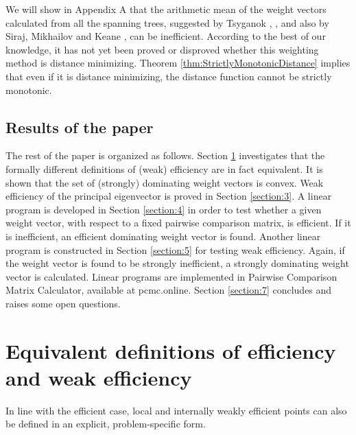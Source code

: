 \documentclass{article}
\theoremstyle{plain}
\begin{document}
We will show in Appendix A that the arithmetic mean of the weight vectors calculated from all the spanning trees,
suggested by Tsyganok \cite{Tsyganok2000}, \cite[Section 3.5 Combinatorial method]{Tsyganok2010},
and also by Siraj, Mikhailov and Keane \cite{SirajMikhailovKeane2012a,SirajMikhailovKeane2012b},
can be inef{\kern0pt}f{\kern0pt}icient. According to the best of our knowledge,
it has not yet been proved or disproved whether this weighting method is distance minimizing.
Theorem \ref{thm:StrictlyMonotonicDistance} implies that even if it is distance minimizing, the distance function
cannot be strictly monotonic. \\


\subsection{Results of the paper}
The rest of the paper is organized as follows.
Section \ref{section:2} investigates that the formally dif{\kern0pt}ferent
def{\kern0pt}initions of (weak) ef{\kern0pt}f{\kern0pt}iciency are in fact
equivalent. It is shown that the set of (strongly) dominating weight vectors is convex.
Weak ef{\kern0pt}f{\kern0pt}iciency of the principal eigenvector is proved in Section \ref{section:3}.
A linear program is developed in Section \ref{section:4} in order to test whether a given weight
vector, with respect to a f{\kern0pt}ixed pairwise comparison matrix, is ef{\kern0pt}f{\kern0pt}icient.
If it is inef{\kern0pt}f{\kern0pt}icient, an ef{\kern0pt}f{\kern0pt}icient dominating weight vector is found.
Another linear program is constructed in Section \ref{section:5} for testing weak ef{\kern0pt}f{\kern0pt}iciency.
Again, if the weight vector is found to be strongly inef{\kern0pt}f{\kern0pt}icient, a strongly dominating weight vector is
calculated.
Linear programs are implemented in Pairwise Comparison Matrix Calculator,  available at pcmc.online.
Section \ref{section:7} concludes and raises some open questions.

\section{Equivalent def{\kern0pt}initions of ef{\kern0pt}f{\kern0pt}iciency and weak ef{\kern0pt}f{\kern0pt}iciency}
\label{section:2} %

In line with the ef{\kern0pt}f{\kern0pt}icient case,
local and internally weakly ef{\kern0pt}f{\kern0pt}icient points can also be def{\kern0pt}ined in an explicit, problem-specif{\kern0pt}ic form.
\end{document}
